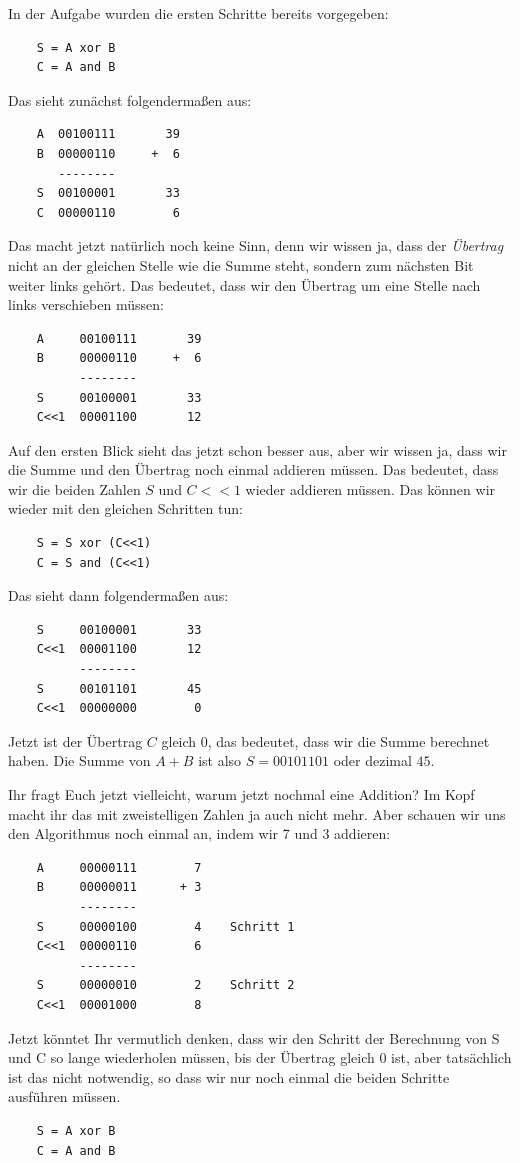 \begin{exercise}
\begin{solution}
      In der Aufgabe wurden die ersten Schritte bereits vorgegeben:
\begin{verbatim}
    S = A xor B
    C = A and B
\end{verbatim}
      Das sieht zunächst folgendermaßen aus:
\begin{lstlisting}
    A  00100111       39
    B  00000110     +  6
       --------   
    S  00100001       33
    C  00000110        6
\end{lstlisting}
      Das macht jetzt natürlich noch keine Sinn, denn wir wissen ja, dass der \textit{Übertrag} nicht an der gleichen Stelle wie die Summe steht, sondern zum nächsten Bit weiter links gehört. Das bedeutet, dass wir den Übertrag um eine Stelle nach links verschieben müssen:
\begin{lstlisting}
    A     00100111       39
    B     00000110     +  6
          --------   
    S     00100001       33
    C<<1  00001100       12
\end{lstlisting}
      Auf den ersten Blick sieht das jetzt schon besser aus, aber wir wissen ja, dass wir die Summe und den Übertrag noch einmal addieren müssen. Das bedeutet, dass wir die beiden Zahlen $S$ und $C<<1$ wieder addieren müssen. Das können wir wieder mit den gleichen Schritten tun:
\begin{verbatim}
    S = S xor (C<<1)
    C = S and (C<<1)
\end{verbatim}
      Das sieht dann folgendermaßen aus:
\begin{lstlisting}
    S     00100001       33
    C<<1  00001100       12
          --------
    S     00101101       45
    C<<1  00000000        0
\end{lstlisting}
      Jetzt ist der Übertrag $C$ gleich 0, das bedeutet, dass wir die Summe berechnet haben. Die Summe von $A+B$ ist also $S=00101101$ oder dezimal $45$.

      Ihr fragt Euch jetzt vielleicht, warum jetzt nochmal eine Addition? Im Kopf macht ihr das mit zweistelligen Zahlen ja auch nicht mehr. Aber schauen wir uns den Algorithmus noch einmal an, indem wir 7 und 3 addieren:
\begin{lstlisting}
    A     00000111        7
    B     00000011      + 3
          --------
    S     00000100        4    Schritt 1
    C<<1  00000110        6
          --------
    S     00000010        2    Schritt 2
    C<<1  00001000        8
\end{lstlisting}
      Jetzt könntet Ihr vermutlich denken, dass wir den Schritt der Berechnung von S und C so lange wiederholen müssen, bis der Übertrag gleich 0 ist, aber tatsächlich ist das nicht notwendig, so dass wir nur noch einmal die beiden Schritte ausführen müssen. 
\begin{verbatim}
    S = A xor B
    C = A and B


\end{verbatim}
\end{solution}
\end{exercise}
